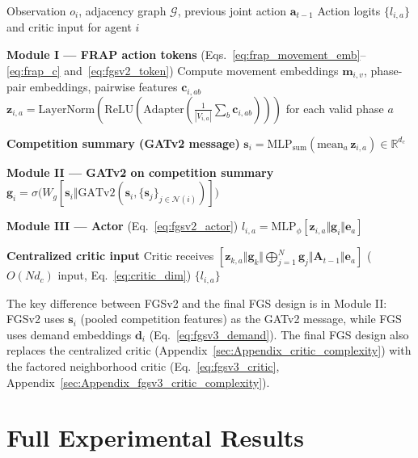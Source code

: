 \begin{algorithm}[ht]
  \caption{FGSv2 Forward Pass (Action tokens; competition-derived GATv2 message; centralized critic)}
  \label{alg:fgsv2_forward}
  \begin{algorithmic}[1]
    \Require Observation $o_i$, adjacency graph $\mathcal{G}$, previous joint action $\mathbf{a}_{t-1}$
    \Ensure Action logits $\{l_{i,a}\}$ and critic input for agent $i$

    \Statex \textbf{Module I — FRAP action tokens} (Eqs.~\ref{eq:frap_movement_emb}--\ref{eq:frap_c} and~\ref{eq:fgsv2_token})
    \State Compute movement embeddings $\mathbf{m}_{i,v}$, phase-pair embeddings, pairwise features $\mathbf{c}_{i,ab}$
    \State $\mathbf{z}_{i,a} = \mathrm{LayerNorm}(\mathrm{ReLU}(\mathrm{Adapter}(\frac{1}{|V_{i,a}|}\sum_b \mathbf{c}_{i,ab})))$ for each valid phase $a$

    \Statex \textbf{Competition summary (GATv2 message)}
    \State $\mathbf{s}_i = \mathrm{MLP}_{\mathrm{sum}}(\mathrm{mean}_a\,\mathbf{z}_{i,a}) \in \mathbb{R}^{d_c}$

    \Statex \textbf{Module II — GATv2 on competition summary}
    \State $\mathbf{g}_i = \sigma\!\bigl(W_g[\mathbf{s}_i \Vert \mathrm{GATv2}(\mathbf{s}_i, \{\mathbf{s}_j\}_{j\in\mathcal{N}(i)})]\bigr)$

    \Statex \textbf{Module III — Actor} (Eq.~\ref{eq:fgsv2_actor})
      \State $l_{i,a} = \mathrm{MLP}_\phi[\mathbf{z}_{i,a} \Vert \mathbf{g}_i \Vert \mathbf{e}_a]$
    \EndFor

    \Statex \textbf{Centralized critic input}
    \State Critic receives $[\mathbf{z}_{k,a} \Vert \mathbf{g}_k \Vert \bigoplus_{j=1}^N \mathbf{g}_j \Vert \mathbf{A}_{t-1} \Vert \mathbf{e}_a]$ \quad ($O(Nd_c)$ input, Eq.~\ref{eq:critic_dim})
    \State \Return $\{l_{i,a}\}$
  \end{algorithmic}
\end{algorithm}

The key difference between FGSv2 and the final FGS design is in Module II: FGSv2 uses $\mathbf{s}_i$ (pooled competition features) as the GATv2 message, while FGS uses demand embeddings $\mathbf{d}_i$ (Eq.~\ref{eq:fgsv3_demand}). The final FGS design also replaces the centralized critic (Appendix~\ref{sec:Appendix_critic_complexity}) with the factored neighborhood critic (Eq.~\ref{eq:fgsv3_critic}, Appendix~\ref{sec:Appendix_fgsv3_critic_complexity}).

\chapter{Full Experimental Results}
\label{ch:Appendix_FullResults}

